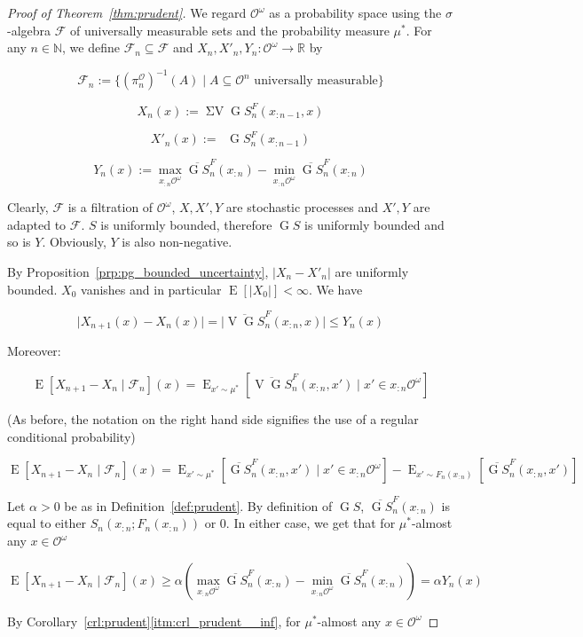 \documentclass[11pt]{article}
\theoremstyle{definition}
\theoremstyle{plain}
\newcommand{\Nats}{\mathbb{N}}
\newcommand{\Reals}{\mathbb{R}}
\newcommand{\A}[1]{\lvert #1 \rvert}
\DeclareMathOperator{\E}{E}
\newcommand{\Ob}{\mathcal{O}}
\newcommand{\OO}{\Ob^\omega}
\newcommand{\PO}{\pi^\Ob}
\DeclareMathOperator{\V}{V}
\DeclareMathOperator{\SV}{\Sigma V}
\DeclareMathOperator{\SVM}{\Sigma V_{\min}}
\DeclareMathOperator{\PG}{G}
\newcommand{\F}{\mathcal{F}}
\begin{document}
\begin{proof}[Proof of Theorem~\ref{thm:prudent}]

We regard ${\OO}$ as a probability space using the ${\sigma}$-algebra $\F$ of universally measurable sets and the probability measure ${\mu^*}$. For any ${n \in \Nats}$, we define ${\F_n \subseteq \F}$ and $X_n,X'_n,Y_n: \OO \rightarrow \Reals$ by 

$$\F_n := \{(\PO_n)^{-1}(A) \mid A \subseteq \Ob^n \text{ universally measurable}\}$$

$$X_n(x):= \SV \PG{S}^F_{n}(x_{:n-1},x)$$

$$X'_n(x):= \SVM \PG{S}^F_{n}(x_{:n-1})$$

$$Y_n(x):=\max_{x_{:n}\OO} \overline{\PG{S}}^F_{n}(x_{:n}) - \min_{x_{:n}\OO} \overline{\PG{S}}^F_{n}(x_{:n})$$

Clearly, ${\F}$ is a filtration of ${\OO}$, ${X,X',Y}$ are stochastic processes and ${X',Y}$ are adapted to ${\F}$. ${S}$ is uniformly bounded, therefore ${\PG{S}}$  is uniformly bounded and so is ${Y}$. Obviously, ${Y}$ is also non-negative.

By Proposition~\ref{prp:pg_bounded_uncertainty}, ${\A{X_n-X'_n}}$ are uniformly bounded. ${X_0}$ vanishes and in particular ${\E[\A{X_0}] < \infty}$. We have

$$\A{X_{n+1}(x)-X_n(x)} = \A{\overline{\V{\PG{S}}}_{n}^F(x_{:n},x)} \leq Y_n(x)$$

Moreover:

$$\E[X_{n+1} - X_n \mid \F_n](x) = \E_{x' \sim \mu^*}[\overline{\V{\PG{S}}}_{n}^F(x_{:n},x') \mid x' \in x_{:n}\OO]$$

(As before, the notation on the right hand side signifies the use of a regular conditional probability)

$$\E[X_{n+1} - X_n \mid \F_n](x) = \E_{x' \sim \mu^*}[\overline{\PG{S}}_{n}^F(x_{:n},x') \mid x' \in x_{:n}\OO] - \E_{x' \sim F_n(x_{:n})}[\overline{\PG{S}}_{n}^F(x_{:n},x')]$$

Let $\alpha > 0$ be as in Definition~\ref{def:prudent}. By definition of $\PG{S}$, $\overline{\PG{S}}_{n}^F(x_{:n})$ is equal to either $S_n(x_{:n};F_n(x_{:n}))$ or 0. In either case, we get that for $\mu^*$-almost any $x \in \OO$

$$\E[X_{n+1} - X_n \mid \F_n](x) \geq \alpha (\max_{x_{:n}\OO} \overline{\PG{S}}_{n}^F(x_{:n}) - \min_{x_{:n}\OO} \overline{\PG{S}}_{n}^F(x_{:n})) = \alpha Y_n(x)$$

By Corollary~\ref*{crl:prudent}\ref{itm:crl_prudent__inf}, for $\mu^*$-almost any $x \in \OO$


\end{proof}
\end{document}
